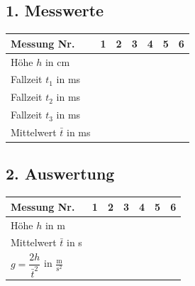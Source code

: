 \documentclass[11pt,a4paper]{scrartcl}
\begin{document}
	\subsection*{1. Messwerte}
	
	\begin{center}
		\renewcommand{\arraystretch}{2.5}
		\begin{tabular}{|p{3.8cm}|p{1.5cm}|p{1.5cm}|p{1.5cm}|p{1.5cm}|p{1.5cm}|p{1.5cm}|}
			\hline
			\textbf{Messung Nr.} & \centering\textbf{1} & \centering\textbf{2} & \centering\textbf{3} & \centering\textbf{4} & \centering\textbf{5} & \centering\arraybackslash\textbf{6} \\
			\hline
			Höhe $h$ in cm & & & & & & \\
			\hline
			Fallzeit $t_1$ in ms & & & & & & \\
			\hline
			Fallzeit $t_2$ in ms & & & & & & \\
			\hline
			Fallzeit $t_3$ in ms & & & & & & \\
			\hline
			Mittelwert $\bar{t}$ in ms & & & & & & \\
			\hline
		\end{tabular}
	\end{center}
	
	\subsection*{2. Auswertung}
	
	\begin{center}
		\renewcommand{\arraystretch}{2.5}
		\begin{tabular}{|p{3.8cm}|p{1.5cm}|p{1.5cm}|p{1.5cm}|p{1.5cm}|p{1.5cm}|p{1.5cm}|}
			\hline
			\textbf{Messung Nr.} & \centering\textbf{1} & \centering\textbf{2} & \centering\textbf{3} & \centering\textbf{4} & \centering\textbf{5} & \centering\arraybackslash\textbf{6} \\
			\hline
			Höhe $h$ in m & & & & & & \\
			\hline
			Mittelwert $\bar{t}$ in s & & & & & & \\
			\hline
			$g = \dfrac{2h}{\bar{t}^2}$ in $\frac{\text{m}}{\text{s}^2}$ & & & & & & \\
			\hline
		\end{tabular}
	\end{center}
	
	\vspace{0.5cm}
	
\end{document}
